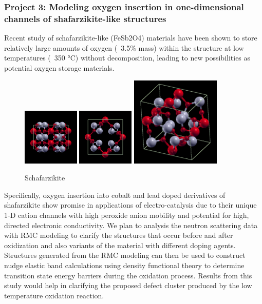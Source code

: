 \subsubsection*{Project 3: Modeling oxygen insertion in one-dimensional channels of shafarzikite-like structures}\label{deLaune}
Recent study of schafarzikite-like (FeSb2O4) materials have been shown to store relatively large amounts of oxygen (~3.5\% mass)
within the structure at low temperatures (~350 °C) without decomposition, leading to new possibilities as potential oxygen storage materials.

\begin{figure}
  \begin{center}
    \includegraphics[width=0.24\textwidth]{graphics/fesb2o4_xaxis.png}
    \includegraphics[width=0.24\textwidth]{graphics/fesb2o4_zaxis.png}
    \includegraphics[width=0.38\textwidth]{graphics/fesb2o4_tilted.png}
  \end{center}
  \caption{Schafarzikite}
\end{figure} Specifically, oxygen insertion into cobalt and lead doped derivatives of shafarzikite show promise in applications of electro-catalysis due to their unique 1-D cation channels with high peroxide anion mobility and potential for high, directed electronic conductivity. We plan to analysis the neutron scattering data with RMC modeling to clarify the structures that occur before and after oxidization and also variants of the material with different doping agents. Structures generated from the RMC modeling can then be used to construct nudge elastic band calculations using density functional theory to determine transition state energy barriers during the oxidation process. Results from this study would help in clarifying the proposed defect cluster produced by the low temperature oxidation reaction.


